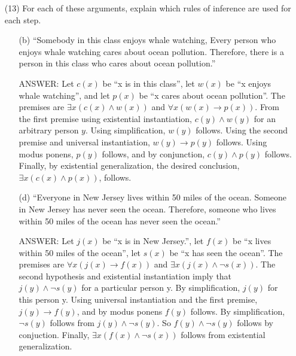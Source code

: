 \documentclass[12pt]{article}
\newenvironment{answer}{\fontfamily{ptm}\selectfont \smaller[1] ANSWER: }{}
\begin{document}
\begin{enumerate} %



\item[(13)] For each of these arguments, explain which rules of inference are used for each step.

\begin{enumerate}
	\item[(b)] ``Somebody in this class enjoys whale watching, Every person who enjoys whale watching cares about ocean pollution. Therefore, there is a person in this class who cares about ocean pollution.''
	
	\begin{answer}
		Let $c(x)$ be ``x is in this class'',  let $w(x)$ be ``x enjoys whale watching'', and let $p(x)$ be ``x cares about ocean pollution''. The premises are $\exists x(c(x) \wedge w(x))$ and $\forall x (w(x) \to p(x))$. From the first premise using existential instantiation, $c(y) \wedge w(y)$ for an arbitrary person $y$. Using simplification, $w(y)$ follows. Using the second premise and universal instantiation, $w(y) \to p(y)$ follows. Using modus ponens, $p(y)$ follows, and by conjunction, $c(y) \wedge p(y)$ follows. Finally, by existential generalization, the desired conclusion, $\exists x(c(x) \wedge p(x))$, follows.
	\end{answer}

	\item[(d)] ``Everyone in New Jersey lives within 50 miles of the ocean. Someone in New Jersey has never seen the ocean. Therefore, someone who lives within 50 miles of the ocean has never seen the ocean.''
	
	\begin{answer}
		Let $j(x)$ be ``x is in New Jersey.'', let $f(x)$ be ``x lives within 50 miles of the ocean'', let $s(x)$ be ``x has seen the ocean''. The premises are $\forall x (j(x) \to f(x))$ and $\exists x (j(x) \wedge \neg s(x))$. The second hypothesis and existential instantiation imply that $j(y) \wedge \neg s(y)$ for a particular person y. By simplification, $j(y)$ for this person y. Using universal instantiation and the first premise, $j(y) \to f(y)$, and by modus ponens $f(y)$ follows. By simplification, $\neg s(y)$ follows from $j(y) \wedge \neg s(y)$. So $f(y) \wedge \neg s(y)$ follows by conjuction. Finally, $\exists x (f(x) \wedge \neg s(x))$ follows from existential generalization.
	\end{answer}
\end{enumerate}


\end{enumerate}
\end{document}
